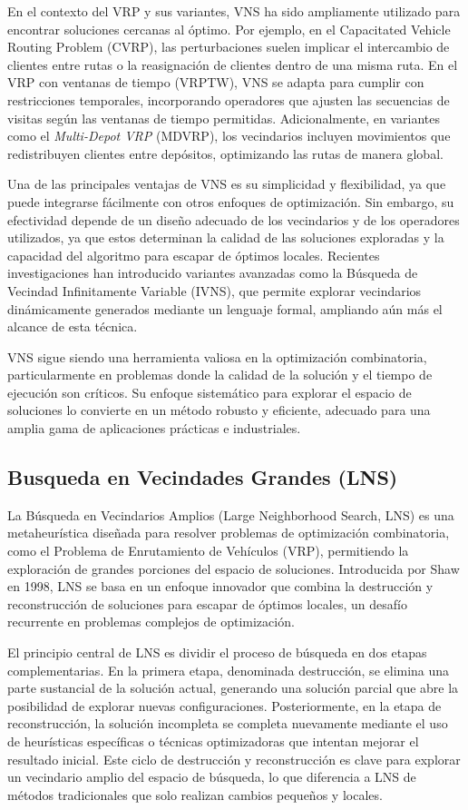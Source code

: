 \documentclass{article}
\begin{document}
En el contexto del VRP y sus variantes, VNS ha sido ampliamente utilizado para encontrar soluciones cercanas al óptimo. Por ejemplo, en el Capacitated Vehicle Routing Problem (CVRP), las perturbaciones suelen implicar el intercambio de clientes entre rutas o la reasignación de clientes dentro de una misma ruta. En el VRP con ventanas de tiempo (VRPTW), VNS se adapta para cumplir con restricciones temporales, incorporando operadores que ajusten las secuencias de visitas según las ventanas de tiempo permitidas. Adicionalmente, en variantes como el \textit{Multi-Depot VRP} (MDVRP), los vecindarios incluyen movimientos que redistribuyen clientes entre depósitos, optimizando las rutas de manera global.

Una de las principales ventajas de VNS es su simplicidad y flexibilidad, ya que puede integrarse fácilmente con otros enfoques de optimización. Sin embargo, su efectividad depende de un diseño adecuado de los vecindarios y de los operadores utilizados, ya que estos determinan la calidad de las soluciones exploradas y la capacidad del algoritmo para escapar de óptimos locales. Recientes investigaciones han introducido variantes avanzadas como la Búsqueda de Vecindad Infinitamente Variable (IVNS), que permite explorar vecindarios dinámicamente generados mediante un lenguaje formal, ampliando aún más el alcance de esta técnica.

VNS sigue siendo una herramienta valiosa en la optimización combinatoria, particularmente en problemas donde la calidad de la solución y el tiempo de ejecución son críticos. Su enfoque sistemático para explorar el espacio de soluciones lo convierte en un método robusto y eficiente, adecuado para una amplia gama de aplicaciones prácticas e industriales.

\subsection{Busqueda en Vecindades Grandes (LNS)}
La Búsqueda en Vecindarios Amplios (Large Neighborhood Search, LNS) es una metaheurística diseñada para resolver problemas de optimización combinatoria, como el Problema de Enrutamiento de Vehículos (VRP), permitiendo la exploración de grandes porciones del espacio de soluciones. Introducida por Shaw en 1998, LNS se basa en un enfoque innovador que combina la destrucción y reconstrucción de soluciones para escapar de óptimos locales, un desafío recurrente en problemas complejos de optimización.

El principio central de LNS es dividir el proceso de búsqueda en dos etapas complementarias. En la primera etapa, denominada destrucción, se elimina una parte sustancial de la solución actual, generando una solución parcial que abre la posibilidad de explorar nuevas configuraciones. Posteriormente, en la etapa de reconstrucción, la solución incompleta se completa nuevamente mediante el uso de heurísticas específicas o técnicas optimizadoras que intentan mejorar el resultado inicial. Este ciclo de destrucción y reconstrucción es clave para explorar un vecindario amplio del espacio de búsqueda, lo que diferencia a LNS de métodos tradicionales que solo realizan cambios pequeños y locales.
\end{document}
